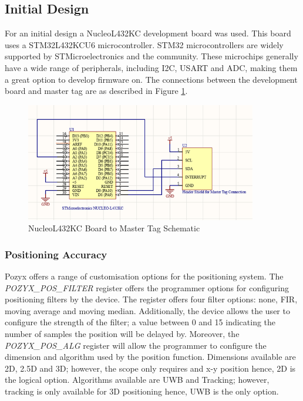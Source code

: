 \documentclass[12pt, a4paper]{article}
\begin{document}
\subsection{Initial Design}
For an initial design a NucleoL432KC development board was used. This board uses a STM32L432KCU6 microcontroller. 
STM32 microcontrollers are widely supported by STMicroelectronics and the community. These microchips generally have a wide range of 
peripherals, including I2C, USART and ADC, making them a great option to develop firmware on. The connections between the development board and 
master tag are as described in Figure \ref{fig:nuc_tag_cct}.
\begin{figure}[h]
    \centering
    \includegraphics[width=0.9\textwidth]{nucleo to tag.png}
    \caption{NucleoL432KC Board to Master Tag Schematic}
    \label{fig:nuc_tag_cct}
\end{figure}
\subsubsection{Positioning Accuracy}
Pozyx offers a range of customisation options for the positioning system. The \textit{POZYX\_POS\_FILTER}
register offers the programmer options for configuring positioning filters by the device. The register offers four filter options: none, FIR, moving 
average and moving median. Additionally, the device allows the user to configure the strength of the filter; a value between 0 and 15 indicating 
the number of samples the position will be delayed by. Moreover, the \textit{POZYX\_POS\_ALG}
register will allow the programmer to configure the dimension and algorithm used by the position function. 
Dimensions available are 2D, 2.5D and 3D; however, the scope only requires and x-y position hence, 2D is the logical option. 
Algorithms available are UWB and Tracking; however, tracking is only available for 3D positioning hence, UWB is the only option. 
\end{document}
